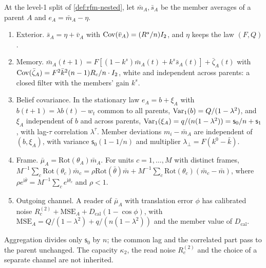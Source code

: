 \begin{proposition}\label{prop:rfm-inheritance}
At the level-1 split of \cref{def:rfm-nested}, let $\bar m_A,\bar s_A$ be the member averages of a parent $A$ and $e_A=\bar m_A-\eta$.
\begin{enumerate}
\item[(a)] Exterior. $\bar s_A=\eta+\bar v_A$ with $\operatorname{Cov}(\bar v_A)=(R^s/n)I_2$, and $\eta$ keeps the law $(F,Q)$.
\item[(b)] Memory. $\bar m_A(t+1)=F[(1-k^s)\bar m_A(t)+k^s\bar s_A(t)]+\bar\zeta_A(t)$ with $\operatorname{Cov}(\bar\zeta_A)=F^2\bar k^2(n-1)R_c/n\cdot I_2$, white and independent across parents: a closed filter with the members' gain $k^s$.
\item[(c)] Belief covariance. In the stationary law $e_A=b+\xi_A$ with $b(t+1)=\lambda b(t)-w_t$ common to all parents, $\operatorname{Var}_1(b)=Q/(1-\lambda^2)$, and $\xi_A$ independent of $b$ and across parents, $\operatorname{Var}_1(\xi_A)=q/(n(1-\lambda^2))=\mathsf s_0/n+\mathsf s_1$, with lag-$\tau$ correlation $\lambda^{\tau}$. Member deviations $m_i-\bar m_A$ are independent of $(b,\xi_A)$, with variance $\mathsf s_0(1-1/n)$ and multiplier $\lambda_\perp=F(k^0-\bar k)$.
\item[(d)] Frame. $\bar\mu_A=\mathrm{Rot}(\theta_A)\bar m_A$. For units $c=1,\dots,M$ with distinct frames, $M^{-1}\sum_c\mathrm{Rot}(\theta_c)\bar m_c=\rho\mathrm{Rot}(\bar\theta)\bar m+M^{-1}\sum_c\mathrm{Rot}(\theta_c)(\bar m_c-\bar m)$, where $\rho e^{\mathrm i\bar\theta}=M^{-1}\sum_ce^{\mathrm i\theta_c}$ and $\rho<1$.
\item[(e)] Outgoing channel. A reader of $\bar\mu_A$ with translation error $\phi$ has calibrated noise $R_c^{(2)}+\mathrm{MSE}_A+D_{\mathrm{cal}}(1-\cos\phi)$, with $\mathrm{MSE}_A=Q/(1-\lambda^2)+q/(n(1-\lambda^2))$ and the member value of $D_{\mathrm{cal}}$.
\end{enumerate}
\end{proposition}

Aggregation divides only $\mathsf s_0$ by $n$; the common lag and the correlated part pass to the parent unchanged. The capacity $\kappa_2$, the read noise $R_c^{(2)}$ and the choice of a separate channel are not inherited.

